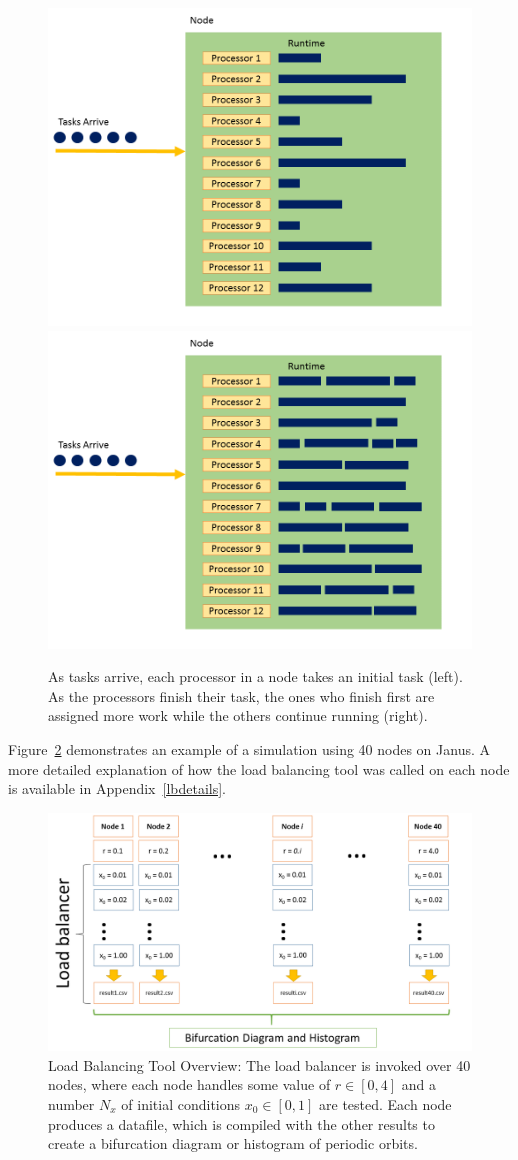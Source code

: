 \begin{figure}[!h]
\caption[Processor work distribution before and after load
balancing]{As tasks arrive, each processor in a node takes an initial
  task (left). As the processors finish their task, the ones who finish first are
assigned more work while the others continue running (right).}\label{fig:loadbalance_node}
\centering
\includegraphics[width=.5\textwidth]{figs/loadbalance_node_start.png}\hfill
\includegraphics[width=.5\textwidth]{figs/loadbalance_node_end.png}
\end{figure}
Figure~\ref{fig:lbtool} demonstrates an example of a simulation
using 40 nodes on Janus. A more detailed explanation of how the load
balancing tool was called on each node is available in
Appendix~\ref{lbdetails}. 
\begin{figure}[H]\linespread{1}   
\caption[Load balancing tool overview]{Load Balancing Tool Overview:
  The load balancer is invoked over 40 nodes, where each node handles
  some value of $r \in [0,4]$ and a number $N_x$ of initial conditions
  $x_0 \in [0,1]$ are tested. Each node produces a datafile, which is
  compiled with the other results to create a bifurcation diagram or
  histogram of periodic orbits.}\label{fig:lbtool}
	\begin{center}
          \includegraphics[scale=0.45]{figs/load_balancer.png}
	\end{center}
\end{figure}

